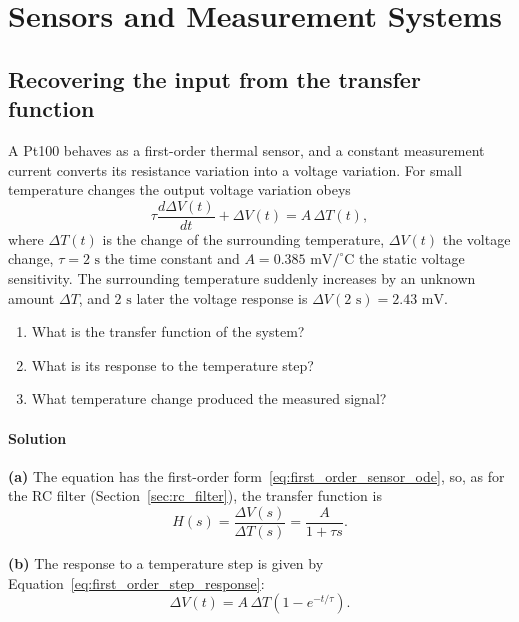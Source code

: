 \section{Sensors and Measurement Systems}
\label{app:ex_ch3}

\subsection{Recovering the input from the transfer function}
\label{ex:recover_input}

A Pt100 behaves as a first-order thermal sensor, and a constant measurement current converts its resistance variation into a voltage variation. For small temperature changes the output voltage variation obeys
\begin{equation*}
\tau\frac{d\Delta V(t)}{dt} + \Delta V(t) = A\,\Delta T(t),
\end{equation*}
where $\Delta T(t)$ is the change of the surrounding temperature, $\Delta V(t)$ the voltage change, $\tau = 2\text{ s}$ the time constant and $A = 0.385\text{ mV}/^\circ\text{C}$ the static voltage sensitivity. The surrounding temperature suddenly increases by an unknown amount $\Delta T$, and $2\text{ s}$ later the voltage response is $\Delta V(2\text{ s}) = 2.43\text{ mV}$.
\begin{enumerate}[label=(\alph*)]
    \item What is the transfer function of the system?
    \item What is its response to the temperature step?
    \item What temperature change produced the measured signal?
\end{enumerate}

\paragraph{Solution} \textbf{(a)} The equation has the first-order form~\eqref{eq:first_order_sensor_ode}, so, as for the RC filter (Section~\ref{sec:rc_filter}), the transfer function is
\begin{equation*}
H(s) = \frac{\Delta V(s)}{\Delta T(s)} = \frac{A}{1 + \tau s}.
\end{equation*}

\textbf{(b)} The response to a temperature step is given by Equation~\eqref{eq:first_order_step_response}:
\begin{equation*}
\Delta V(t) = A\,\Delta T\left(1 - e^{-t/\tau}\right).
\end{equation*}

